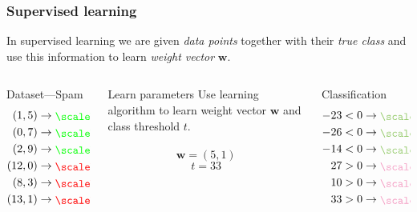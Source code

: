 \documentclass{beamer}
\newcommand*{\LargerCdot}{\raisebox{-0.25ex}{\scalebox{3.0}{$\cdot$}}}
\begin{document}
  \begin{frame}
    \frametitle{Supervised learning}
    In supervised learning we are given \emph{data points} together with their \emph{true class} and use this information to learn \emph{weight vector} $\mathbf{w}$.
    \begin{columns}
      \begin{column}{3cm}
        \begin{block}{Dataset---Spam}
          \begin{align*}
            (1,5)  & \rightarrow \textcolor{green}{\LargerCdot}\\
            (0,7)  & \rightarrow \textcolor{green}{\LargerCdot}\\
            (2,9)  & \rightarrow \textcolor{green}{\LargerCdot}\\
            (12,0) & \rightarrow \textcolor{red}{\LargerCdot}\\
            (8,3)  & \rightarrow \textcolor{red}{\LargerCdot}\\
            (13,1) & \rightarrow \textcolor{red}{\LargerCdot}
          \end{align*}
        \end{block}
      \end{column}
      \begin{column}{3cm}
        \begin{block}{Learn parameters}
          Use learning algorithm to learn weight vector $\mathbf{w}$ and class threshold $t$.\\
          ~\vspace*{.45cm}
          $$
            \mathbf{w} = (5,1)
          $$
          $$
            t = 33
          $$
        \end{block}
      \end{column}
      \begin{column}{3cm}
        \begin{block}{Classification}
          \begin{align*}
            -23 <0  & \rightarrow \textcolor{greenish}{\LargerCdot}\\
            -26  <0 & \rightarrow \textcolor{greenish}{\LargerCdot}\\
            -14  <0 & \rightarrow \textcolor{greenish}{\LargerCdot}\\
            27 >0 & \rightarrow \textcolor{redish}{\LargerCdot}\\
            10  >0 & \rightarrow \textcolor{redish}{\LargerCdot}\\
            33 >0 & \rightarrow \textcolor{redish}{\LargerCdot}
          \end{align*}
        \end{block}
      \end{column}
    \end{columns}
  \end{frame}
\end{document}
